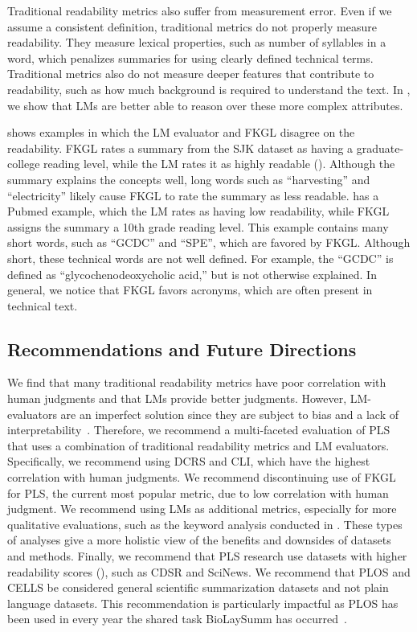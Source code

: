 Traditional readability metrics also suffer from measurement error. Even if we assume a consistent definition, traditional metrics do not properly measure readability. They measure lexical properties, such as number of syllables in a word, which penalizes summaries for using clearly defined technical terms. Traditional metrics also do not measure deeper features that contribute to readability, such as how much background is required to understand the text. In , we show that LMs are better able to reason over these more complex attributes. 

 shows examples in which the LM evaluator and FKGL disagree on the readability. FKGL rates a summary from the SJK dataset as having a graduate-college reading level, while the LM rates it as highly readable (). Although the summary explains the concepts well, long words such as ``harvesting'' and ``electricity'' likely cause FKGL to rate the summary as less readable.  has a Pubmed example, which the LM rates as having low readability, while FKGL assigns the summary a 10th grade reading level. This example contains many short words, such as ``GCDC'' and ``SPE'', which are favored by FKGL. Although short, these technical words are not well defined. For example, the  ``GCDC'' is defined as ``glycochenodeoxycholic acid,'' but  is not otherwise explained. In general, we  notice that FKGL favors acronyms, which are often present in technical text.

\subsection{Recommendations and Future Directions}\label{subsec:recommendations}
We find that many traditional readability metrics have poor correlation with human judgments and that LMs provide better judgments. However, LM-evaluators are an imperfect solution since they are subject to bias and a lack of interpretability~\cite{Liu2023LLMsAN, Wang2023LargeLM, Shen2023LargeLM, Stureborg2024LargeLM}. Therefore, we recommend a multi-faceted evaluation of PLS that uses a combination of traditional readability metrics and LM evaluators. Specifically, we recommend using DCRS and CLI, which have the highest correlation with human judgments. We recommend discontinuing use of FKGL for PLS, the current most popular metric, due to low correlation with human judgment. We recommend using LMs as additional metrics, especially for more qualitative evaluations, such as the keyword analysis conducted in . These types of analyses give a more holistic view of the benefits and downsides of datasets and methods. Finally, we recommend that PLS research use datasets with higher readability scores (), such as CDSR and SciNews. We recommend that PLOS and CELLS be considered general scientific summarization datasets and not plain language datasets. This recommendation is particularly impactful as PLOS has been used in every year the shared task BioLaySumm has occurred~\cite{goldsack-etal-2024-biolaysumm,biolaysumm-2023-overview}.

